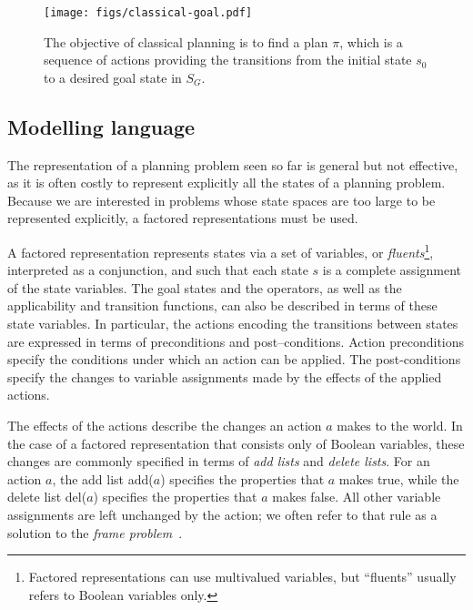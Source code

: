 \begin{figure}[bt] 
\texttt{[image: figs/classical-goal.pdf]}
 \caption[A solution plan $\pi$ for a classical planning problem]{The objective of classical planning  is to
find a plan $\pi$, which is a sequence of actions providing the transitions from the initial state $s_0$
to a desired goal state in $S_G$.}
\end{figure}

\subsection{Modelling language}
The representation of a planning problem seen so far is general but not 
effective, as it is often costly to represent explicitly all the states of
a planning problem.
%
%
Because we are interested in problems whose state spaces are too large to be represented explicitly, 
a  factored  representations must be used.
% 

A factored representation represents states via 
a set of variables, or \emph{fluents}\footnote{
Factored representations can use multivalued variables, but
``fluents'' usually refers to Boolean variables only.
}, interpreted as a conjunction, and 
 such that each state
$s$ is a complete assignment of the state variables.
%
%
%
The goal states and the operators, as well as the 
applicability and transition functions, can also be described in terms of these state variables.
%
In particular, the actions encoding the transitions between states
are expressed in terms of preconditions and post--conditions.
%
Action preconditions specify the conditions under which an action can be applied.
The post-conditions specify  the changes to variable assignments
made by the effects of the applied actions.


The effects of the actions describe the changes
an action $a$ makes to the world. %
In the case of a factored representation that consists
only of Boolean variables, these changes are commonly specified in terms of
\emph{add lists} and \emph{delete lists}.  
For an action $a$, the add
list add($a$) specifies the properties that $a$ makes true, while the delete
list del($a$) specifies the properties that $a$ makes false.
%
All other variable assignments are left unchanged by the action; we often refer to that rule as
a solution to the \emph{frame problem}~\citep{mccarthy:frame}.



